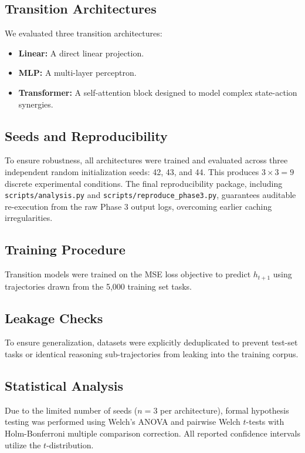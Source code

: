 \documentclass[conference]{IEEEtran}
\begin{document}
\subsection{Transition Architectures}
We evaluated three transition architectures:
\begin{itemize}
    \item \textbf{Linear:} A direct linear projection.
    \item \textbf{MLP:} A multi-layer perceptron.
    \item \textbf{Transformer:} A self-attention block designed to model complex state-action synergies.
\end{itemize}

\subsection{Seeds and Reproducibility}
To ensure robustness, all architectures were trained and evaluated across three independent random initialization seeds: 42, 43, and 44. This produces $3 \times 3 = 9$ discrete experimental conditions. The final reproducibility package, including \texttt{scripts/analysis.py} and \texttt{scripts/reproduce\_phase3.py}, guarantees auditable re-execution from the raw Phase 3 output logs, overcoming earlier caching irregularities.

\subsection{Training Procedure}
Transition models were trained on the MSE loss objective to predict $h_{t+1}$ using trajectories drawn from the 5,000 training set tasks.

\subsection{Leakage Checks}
To ensure generalization, datasets were explicitly deduplicated to prevent test-set tasks or identical reasoning sub-trajectories from leaking into the training corpus.

\subsection{Statistical Analysis}
Due to the limited number of seeds ($n=3$ per architecture), formal hypothesis testing was performed using Welch's ANOVA and pairwise Welch $t$-tests with Holm-Bonferroni multiple comparison correction. All reported confidence intervals utilize the $t$-distribution.
\end{document}
